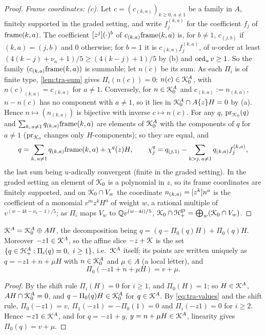 \begin{proof}
\emph{Frame coordinates: (c).} Let $c = (c_{(k,a)})_{k\geq 0,\,a\neq 1}$ be a family in $A$, finitely supported in the graded setting, and write $f^{(k,a)}_j$ for the coefficient $f_j$ of $\mathrm{frame}(k,a)$. The coefficient $[z^j](\cdot)^b$ of $c_{(k,a)}\mathrm{frame}(k,a)$ is, for $b\neq 1$, $c_{(j,b)}$ if $(k,a) = (j,b)$ and $0$ otherwise; for $b = 1$ it is $c_{(k,a)}f^{(k,a)}_j$, of $u$-order at least $(4(k-j)+\nu_a+1)/5\geq(4(k-j)+1)/5$ by (b) and $\operatorname{ord}_uv\geq 1$. So the family $(c_{(k,a)}\mathrm{frame}(k,a))$ is summable; let $n(c)$ be its sum. As each $\Pi_i$ is of finite type, \cref{lem:tra-sum} gives $\Pi_i(n(c)) = 0$: $n(c)\in\mathcal{K}_{0}^A$, with $n(c)_{(k,a)} = c_{(k,a)}$ for $a\neq 1$. Conversely, for $n\in\mathcal{K}_{0}^A$ and $c_{(k,a)} := n_{(k,a)}$, $n-n(c)$ has no component with $a\neq 1$, so it lies in $\mathcal{K}_{0}^A\cap A\{z\}H = 0$ by (a). Hence $n\mapsto(n_{(k,a)})$ is bijective with inverse $c\mapsto n(c)$. For any $q$, $\mathrm{pr}_{\mathcal{K}_{0}}(q)$ and $\sum_{k,\,a\neq 1}q_{(k,a)}\mathrm{frame}(k,a)$ are elements of $\mathcal{K}_{0}^A$ with the components of $q$ for $a\neq 1$ ($\mathrm{pr}_{\mathcal{K}_{0}}$ changes only $H$-components); so they are equal, and
\begin{equation}
\label{eq:tra-decomp}
q = \sum_{k,\,a\neq 1}q_{(k,a)}\mathrm{frame}(k,a)+\chi^q(z)H,\qquad \chi^q_j = q_{(j,1)}-\sum_{k>j,\,a\neq 1}q_{(k,a)}f^{(k,a)}_j,
\end{equation}
the last sum being $u$-adically convergent (finite in the graded setting). In the graded setting an element of $\mathcal{K}_{0}$ is a polynomial in $z$, so its frame coordinates are finitely supported, and on $\mathcal{K}_{0}\cap V_w$ the coordinate $n_{(k,a)} = [z^k]n^a$ is the coefficient of a monomial $v^mz^kH^a$ of weight $w$, a rational multiple of $v^{(w-4k-\nu_a-1)/5}$; as $\Pi_i$ maps $V_w$ to $\mathbb{Q} v^{(w-4i)/5}$, $\mathcal{K}_{0}\cap\mathcal{H}^{\mathrm{gr}}_+ = \bigoplus_w(\mathcal{K}_{0}\cap V_w)$.
\end{proof}

\begin{cor}
\label{cor:tra-slice}
$\mathcal{K}^A = \mathcal{K}_{0}^A\oplus AH$, the decomposition being $q = (q-\Pi_0(q)H)+\Pi_0(q)H$. Moreover $-z1\in\mathcal{K}^A$, so the affine slice $-z+\mathcal{K}$ is the set $\{q\in\mathcal{H}^A_+ : \Pi_i(q) = 0,\ i\geq 1\}$, i.e.\ $\mathcal{K}^A$ itself; its points are written uniquely as $q = -z1+n+\mu H$ with $n\in\mathcal{K}_{0}^A$ and $\mu\in A$ (a local letter), and
\[
\Pi_0(-z1+n+\mu H) = v+\mu .
\]
\end{cor}

\begin{proof}
By the shift rule $\Pi_i(H) = 0$ for $i\geq 1$, and $\Pi_0(H) = 1$; so $H\in\mathcal{K}^A$, $AH\cap\mathcal{K}_{0}^A = 0$, and $q-\Pi_0(q)H\in\mathcal{K}_{0}^A$ for $q\in\mathcal{K}^A$. By \eqref{eq:tra-values} and the shift rule, $\Pi_0(-z1) = v$, $\Pi_1(-z1) = -\Pi_0(1) = 0$ and $\Pi_i(-z1) = 0$ for $i\geq 2$. Hence $-z1\in\mathcal{K}^A$, and for $q = -z1+y$, $y = n+\mu H\in\mathcal{K}^A$, linearity gives $\Pi_0(q) = v+\mu$.
\end{proof}

